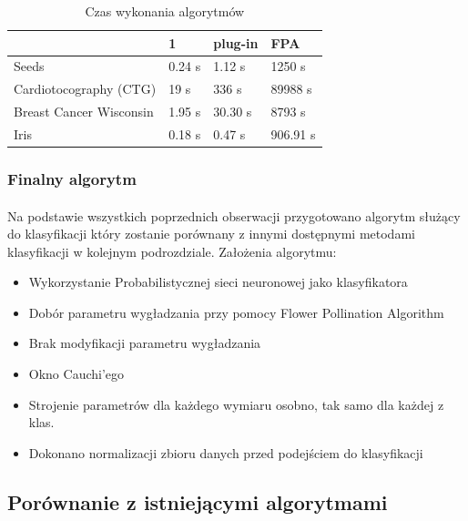 \documentclass[a4paper,12pt,twoside]{article}
\begin{document}
\begin{table}[H]
\centering
\caption{Czas wykonania algorytmów}
\label{plugvsfpa3}
\begin{tabular}{|l|l|l|l|}
\hline
          & 1 & plug-in & FPA\\ \hline
Seeds   &  0.24 s & 1.12 s & 1250 s \\ \hline
Cardiotocography (CTG)   & 19 s & 336 s  & 89988 s\\ \hline
Breast Cancer Wisconsin  &1.95 s & 30.30 s &8793 s\\ \hline
Iris  & 0.18 s & 0.47 s &906.91 s\\ \hline
\end{tabular}
\end{table}
\paragraph{}
\subsubsection{Finalny algorytm}
\paragraph{}
Na podstawie wszystkich poprzednich obserwacji przygotowano algorytm służący do klasyfikacji który zostanie porównany z innymi dostępnymi metodami klasyfikacji w kolejnym podrozdziale. 
Założenia algorytmu:
\begin{itemize}
\item Wykorzystanie Probabilistycznej sieci neuronowej jako klasyfikatora
\item Dobór parametru wygładzania przy pomocy Flower Pollination Algorithm
\item Brak modyfikacji parametru wygładzania
\item Okno Cauchi'ego
\item Strojenie parametrów dla każdego wymiaru osobno, tak samo dla każdej z klas. 
\item Dokonano normalizacji zbioru danych przed podejściem do klasyfikacji
\end{itemize}
\subsection{Porównanie z istniejącymi algorytmami}
\end{document}
